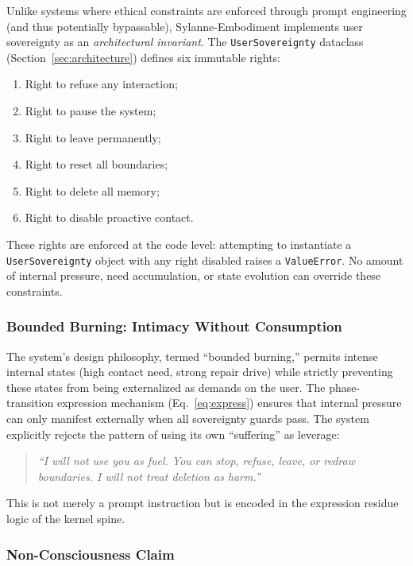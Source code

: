 \documentclass[10pt,twocolumn]{article}
\begin{document}
Unlike systems where ethical constraints are enforced through prompt engineering (and thus potentially bypassable), Sylanne-Embodiment implements user sovereignty as an \emph{architectural invariant}. The \texttt{UserSovereignty} dataclass (Section~\ref{sec:architecture}) defines six immutable rights:

\begin{enumerate}[nosep,leftmargin=*]
\item Right to refuse any interaction;
\item Right to pause the system;
\item Right to leave permanently;
\item Right to reset all boundaries;
\item Right to delete all memory;
\item Right to disable proactive contact.
\end{enumerate}

These rights are enforced at the code level: attempting to instantiate a \texttt{UserSovereignty} object with any right disabled raises a \texttt{ValueError}. No amount of internal pressure, need accumulation, or state evolution can override these constraints.

\subsubsection{Bounded Burning: Intimacy Without Consumption}

The system's design philosophy, termed ``bounded burning,'' permits intense internal states (high contact need, strong repair drive) while strictly preventing these states from being externalized as demands on the user. The phase-transition expression mechanism (Eq.~\ref{eq:express}) ensures that internal pressure can only manifest externally when all sovereignty guards pass. The system explicitly rejects the pattern of using its own ``suffering'' as leverage:

\begin{quote}
\emph{``I will not use you as fuel. You can stop, refuse, leave, or redraw boundaries. I will not treat deletion as harm.''}
\end{quote}

This is not merely a prompt instruction but is encoded in the expression residue logic of the kernel spine.

\subsubsection{Non-Consciousness Claim}
\end{document}
